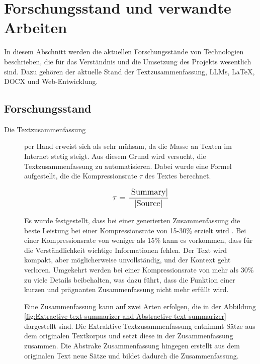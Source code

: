 \chapter{Forschungsstand und verwandte Arbeiten}

In diesem Abschnitt werden die aktuellen Forschungsstände von Technologien beschrieben, die für das Verständnis und die Umsetzung des Projekts wesentlich sind. Dazu gehören der aktuelle Stand der Textzusammenfassung, \ac{LLM}s, LaTeX, \ac{DOCX} und Web-Entwicklung.

\section{Forschungsstand}
\begin{description}
    \item[Die Textzusammenfassung] per Hand erweist sich als sehr mühsam, da die Masse an Texten im Internet stetig steigt. Aus diesem Grund wird versucht, die Textzusammenfassung zu automatisieren. Dabei wurde eine Formel aufgestellt, die die Kompressionsrate $\tau$ des Textes berechnet. \cite[S.1]{yadav2022automatictextsummarizationmethods}

    \begin{align}
    \mathlarger{\tau = \frac{| \text{Summary} |}{| \text{Source} |}}
    \end{align}

    Es wurde festgestellt, dass bei einer generierten Zusammenfassung die beste Leistung bei einer Kompressionsrate von 15-30\% erzielt wird \cite[S.1]{yadav2022automatictextsummarizationmethods}. Bei einer Kompressionsrate von weniger als 15\% kann es vorkommen, dass für die Verständlichkeit wichtige Informationen fehlen. Der Text wird kompakt, aber möglicherweise unvollständig, und der Kontext geht verloren. Umgekehrt werden bei einer Kompressionsrate von mehr als 30\% zu viele Details beibehalten, was dazu führt, dass die Funktion einer kurzen und prägnanten Zusammenfassung nicht mehr erfüllt wird.

    Eine Zusammenfassung kann auf zwei Arten erfolgen, die in der Abbildung \ref{fig:Extractive text summarizer and Abstractive text summarizer} dargestellt sind. Die Extraktive Textzusammenfassung entnimmt Sätze aus dem originalen Textkorpus und setzt diese in der Zusammenfassung zusammen. Die Abstrake Zusammenfassung hingegen erstellt aus dem originalen Text neue Sätze und bildet dadurch die Zusammenfassung. \cite[S.3]{yadav2022automatictextsummarizationmethods}


\end{description}
